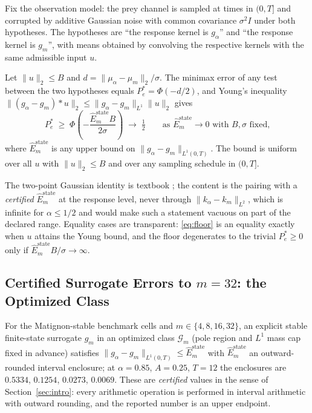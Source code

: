 \documentclass[mathematics,article,accept,pdftex,moreauthors]{Definitions/mdpi}
\newcommand{\Estate}{\widehat{E}_m^{\mathrm{state}}}
\begin{document}
Fix the observation model: the prey channel is sampled at times in $(0,T]$ and corrupted by additive Gaussian noise with common covariance $\sigma^{2}I$ under both hypotheses. The hypotheses are ``the response kernel is $g_{\alpha}$'' and ``the response kernel is $g_{m}$'', with means obtained by convolving the respective kernels with the same admissible input $u$.

\begin{Theorem}
\label{thm:floor}
Let $\|u\|_{2}\le B$ and $d=\|\mu_{\alpha}-\mu_{m}\|_{2}/\sigma$. The minimax error of any test between the two hypotheses equals $P_{e}^{*}=\Phi(-d/2)$, and Young's inequality $\|(g_{\alpha}-g_{m})*u\|_{2}\le\|g_{\alpha}-g_{m}\|_{L^{1}}\|u\|_{2}$ gives
\begin{equation}
P_{e}^{*}\;\ge\;\Phi\!\left(-\frac{\Estate B}{2\sigma}\right)\;\longrightarrow\;\tfrac12
\qquad\text{as }\Estate\to0\text{ with }B,\sigma\text{ fixed,}
\label{eq:floor}
\end{equation}
where $\Estate$ is any upper bound on $\|g_{\alpha}-g_{m}\|_{L^{1}(0,T)}$. The bound is uniform over all $u$ with $\|u\|_{2}\le B$ and over any sampling schedule in $(0,T]$.
\end{Theorem}

The two-point Gaussian identity is textbook \cite{Kay1998}; the content is the pairing with a \emph{certified} $\Estate$ at the response level, never through $\|k_{\alpha}-k_{m}\|_{L^{2}}$, which is infinite for $\alpha\le1/2$ and would make such a statement vacuous on part of the declared range. Equality cases are transparent: \eqref{eq:floor} is an equality exactly when $u$ attains the Young bound, and the floor degenerates to the trivial $P_{e}^{*}\ge0$ only if $\Estate B/\sigma\to\infty$.

\subsection{Certified Surrogate Errors to \boldmath$m=32$: the Optimized Class}

For the Matignon-stable benchmark cells and $m\in\{4,8,16,32\}$, an explicit stable finite-state surrogate $g_{m}$ in an optimized class $\mathcal{G}_{m}$ (pole region and $L^{1}$ mass cap fixed in advance) satisfies $\|g_{\alpha}-g_{m}\|_{L^{1}(0,T)}\le\Estate$ with $\Estate$ an outward-rounded interval enclosure; at $\alpha=0.85$, $A=0.25$, $T=12$ the enclosures are $0.5334$, $0.1254$, $0.0273$, $0.0069$. These are \emph{certified} values in the sense of Section~\ref{sec:intro}: every arithmetic operation is performed in interval arithmetic with outward rounding, and the reported number is an upper endpoint.
\end{document}
